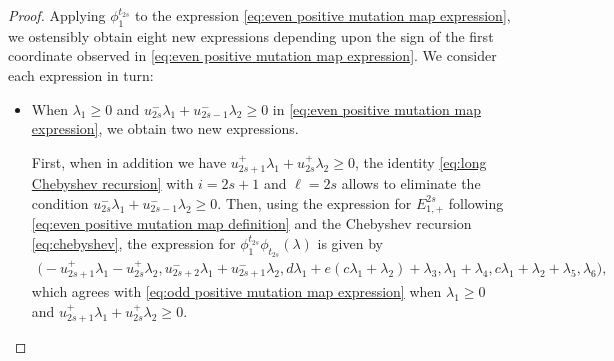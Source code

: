 \documentclass{amsart}
\numberwithin{theorem}{section}
\begin{document}
\begin{proof}
    Applying $\phi^{t_{2s}}_1$ to the expression \eqref{eq:even positive mutation map expression}, we ostensibly obtain eight new expressions depending upon the sign of the first coordinate observed in \eqref{eq:even positive mutation map expression}.
    We consider each expression in turn:
    \begin{itemize}
      \item When $\lambda_1 \ge 0$ and $u_{2s}^-\lambda_1+u_{2s-1}^-\lambda_2 \ge 0$ in \eqref{eq:even positive mutation map expression}, we obtain two new expressions.

        First, when in addition we have $u_{2s+1}^+\lambda_1+u_{2s}^+\lambda_2 \ge 0$, the identity \eqref{eq:long Chebyshev recursion} with $i=2s+1$ and $\ell=2s$ allows to eliminate the condition $u_{2s}^-\lambda_1+u_{2s-1}^-\lambda_2 \ge 0$.
        Then, using the expression for $E^{2s}_{1,+}$ following \eqref{eq:even positive mutation map definition} and the Chebyshev recursion \eqref{eq:chebyshev}, the expression for $\phi^{t_{2s}}_1\phi_{t_{2s}}(\lambda)$ is given by
        \begin{align*}
          \big(-u_{2s+1}^+\lambda_1-u_{2s}^+\lambda_2,u_{2s+2}^-\lambda_1+u_{2s+1}^-\lambda_2,d\lambda_1+e(c\lambda_1+\lambda_2)+\lambda_3,\lambda_1+\lambda_4,c\lambda_1+\lambda_2+\lambda_5,\lambda_6\big),
        \end{align*}
        which agrees with \eqref{eq:odd positive mutation map expression} when $\lambda_1 \ge 0$ and $u_{2s+1}^+\lambda_1+u_{2s}^+\lambda_2 \ge 0$.


\end{itemize}
\end{proof}
\end{document}
